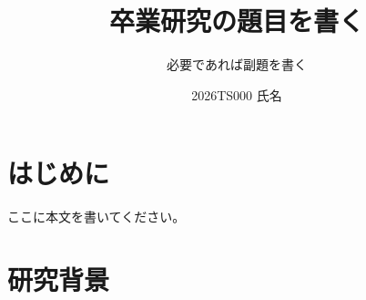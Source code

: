 \documentclass[no-page-number]{nanzan-abstract}
\title{卒業研究の題目を書く}
\subtitle{必要であれば副題を書く} %
\author{2026TS000 氏名}
\begin{document}
\maketitle


\section{はじめに}

%
%
%
%
%
%
%
%
%

ここに本文を書いてください。


\section{研究背景}

%
%
%
%
%
%
%
%
%
%
%
%
%
%
\end{document}
